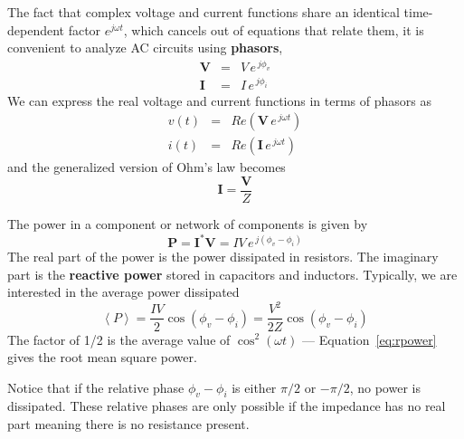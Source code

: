 \documentclass[11pt]{article}
\begin{document}
The fact that complex voltage and current functions share an identical
time-dependent factor $e^{j \omega t}$, which cancels out of
equations that relate them, it is convenient to analyze AC circuits
using \textbf{phasors},
\begin{eqnarray}
  \mathbf{V} &=& V \, e^{\,j \phi_v}\\
  \nonumber
  \mathbf{I} &=& I \, e^{\,j \phi_i}
\end{eqnarray}
We can express the real voltage and current functions in terms of
phasors as
\begin{eqnarray}
  v(t) &=& Re(\mathbf{V} \, e^{\,j\omega t})\\
  \nonumber
  i(t) &=& Re(\mathbf{I} \, e^{\,j\omega t})
\end{eqnarray}
and the generalized version of Ohm's law becomes
\begin{equation}
  \mathbf{I} = \frac{\mathbf{V}}{Z}
  \label{eq:genohmphasor}
\end{equation}

The power in a component or network of components is given by
\begin{equation}
  \mathbf{P} = \mathbf{I^*V} = IV \, e^{\,j(\phi_v - \phi_i)}
  \label{eq:complexpower}
\end{equation}
The real part of the power is the power dissipated in resistors. The
imaginary part is the \textbf{reactive power} stored in capacitors and
inductors. Typically, we are interested in the average power
dissipated
\begin{equation}
  \left< P \right> = \frac{IV}{2} \cos(\phi_v - \phi_i)
                   = \frac{V^2}{2Z} \cos(\phi_v - \phi_i)
  \label{eq:rpower}
\end{equation}
The factor of 1/2 is the average value of $\cos^2(\omega t)$ ---
Equation~\ref{eq:rpower} gives the root mean square power.

Notice that if the relative phase $\phi_v - \phi_i$ is either $\pi/2$
or $-\pi/2$, no power is dissipated. These relative phases are only
possible if the impedance has no real part meaning there is no
resistance present.


\vspace{12 pt}
\noindent
{}
\end{document}
